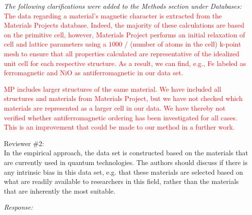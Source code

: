 \documentclass[11pt, a4paper]{letter} %
\newcommand{\mrk}[1]{\textcolor{red}{#1}}
\begin{document}
\textit{The following clarifications were added to the Methods section under Databases:} \\ 
\mrk{The data regarding a material's magnetic character is extracted from the Materials Projects database. Indeed, the majority of these calculations are based on the primitive cell, however, Materials Project performs an initial relaxation of cell and lattice parameters using a $1000$ / (number of atoms in the cell) k-point mesh to ensure that all properties calculated are representative of the idealized unit cell for each respective structure. As a result, we can find, e.g., Fe labeled as ferromagnetic and NiO as antiferromagnetic in our data set.} 

\mrk{MP includes larger structures of the same material. We have included all structures and materials from Materials Project, but we have not checked which materials are represented as a larger cell in our data. We have thereby not verified whether antiferromagnetic ordering has been investigated for all cases. This is an improvement that could be made to our method in a further work.}




Reviewer \#2: \\
In the empirical approach, the data set is constructed based on the materials that are currently used in quantum technologies. The authors should discuss if there is any intrinsic bias in this data set, e.g. that these materials are selected based on what are readily available to researchers in this field, rather than the materials that are inherently the most suitable.

\textit{Response:}
\end{document}
